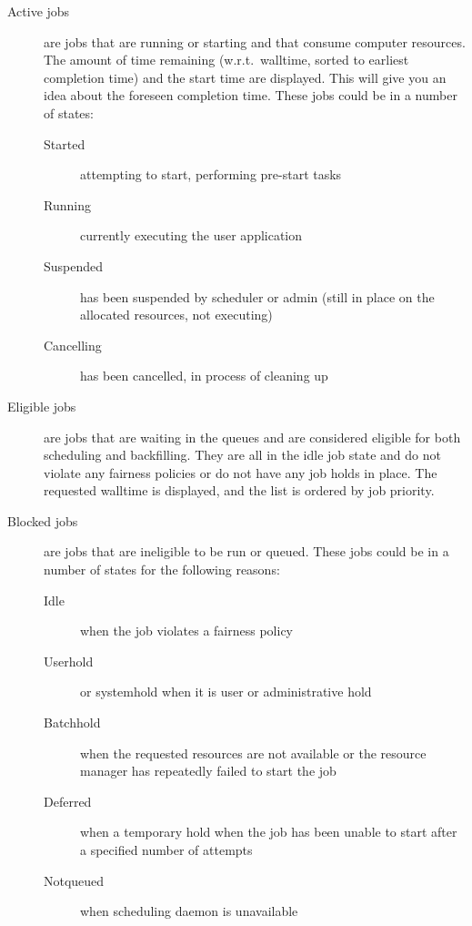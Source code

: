   \begin{description}
    \item[Active jobs] are jobs that are running or starting and that consume computer resources. The amount of time remaining (w.r.t.\ walltime, sorted to earliest completion time) and the start time are displayed. This will give you an idea about the foreseen completion time. These jobs could be in a number of states:

    \begin{description}
      \item[Started] attempting to start, performing pre-start tasks
      \item[Running] currently executing the user application
      \item[Suspended] has been suspended by scheduler or admin (still in place
        on the allocated resources, not executing)
      \item[Cancelling] has been cancelled, in process of cleaning up
    \end{description}

    \item[Eligible jobs] are jobs that are waiting in the queues and are
      considered eligible for both scheduling and backfilling.  They are all in
      the idle job state and do not violate any fairness policies or do not have
      any job holds in place. The requested walltime is displayed, and the list
      is ordered by job priority.
    \item[Blocked jobs] are jobs that are ineligible to be run or queued.  These
      jobs could be in a number of states for the following reasons:

    \begin{description}
      \item[Idle] when the job violates a fairness policy
      \item[Userhold] or systemhold when it is user or administrative hold
      \item[Batchhold] when the requested resources are not available or the resource manager has repeatedly failed to start the job
      \item[Deferred] when a temporary hold when the job has been unable to start after a specified number of attempts
      \item[Notqueued] when scheduling daemon is unavailable
    \end{description}
  \end{description}
\fi
\fi

